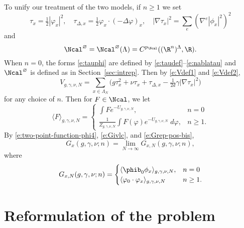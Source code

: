 To unify our treatment of the two models, if $n \ge 1$ we set
\begin{equation}
\label{e:tauphi}
\tau_x = \tfrac{1}{2} |\varphi_x|^2,
  \quad
\tau_{\Delta,x} = \tfrac{1}{2} \varphi_x \cdot (-\Delta \varphi)_x,
  \quad
|\nabla\tau_x|^2 = \sum_e (\nabla^e |\phi_x|^2)^2
\end{equation}
and
\begin{equation}
\label{e:Ncaldef}
\Ncal^\varnothing
  = \Ncal^\varnothing(\Lambda)
  = C^{p_\Ncal}((\R^n)^\Lambda,\R).
\end{equation}
When $n = 0$, the forms \eqref{e:tauphi} are defined by
\eqref{e:taudef}--\eqref{e:nablatau}
and $\Ncal^\varnothing$ is defined as in Section~\ref{sec:intrep}.
Then by \eqref{e:Vdef1} and \eqref{e:Vdef2},
\begin{equation}
V_{g,\gamma,\nu,N}
  =
\sum_{x\in\Lambda_N}
\Big(
  g \tau_x^2 + \nu \tau_x + \tau_{\Delta,x} - \tfrac{1}{2 d} \gamma |\nabla\tau_x|^2
\Big)
\end{equation}
for any choice of $n$.
Then for $F \in \Ncal$, we let
\begin{equation}
\langle F \rangle_{g,\gamma,\nu,N}
  =
\begin{cases}
\displaystyle \int F e^{-U_{g,\gamma,\nu,N}},           & n = 0 \\
\displaystyle \frac{1}{Z_{g,\gamma,\nu,N}}
  \int F(\varphi) e^{-U_{g,\gamma,\nu,N}} \; d\varphi,  & n \ge 1.
\end{cases}
\end{equation}
By \eqref{e:two-point-function-phi4}, \eqref{e:Givlc}, and \eqref{e:Grep-pos-bis},
\begin{equation}
G_x(g, \gamma, \nu; n) = \lim_{N\to\infty} G_{x,N}(g, \gamma, \nu; n),
\end{equation}
where
\begin{equation}
G_{x,N}(g, \gamma, \nu; n)
  =
\begin{cases}
\langle \phib_0 \phi_x \rangle_{g,\gamma,\nu,N},      & n = 0 \\
\langle \varphi_0 \cdot \varphi_x \rangle_{g,\gamma,\nu,N}  & n \ge 1.
\end{cases}
\end{equation}


\section{Reformulation of the problem}

